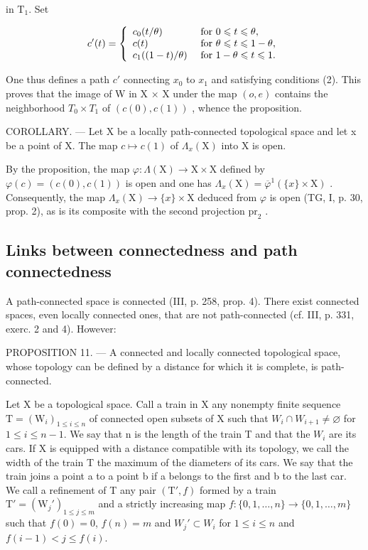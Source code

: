 in \(\mathrm{T}_1\). Set

\[
c ^ {\prime} (t) = \left\{ \begin{array}{l l} c _ {0} (t / \theta) & \text { for } 0 \leqslant t \leqslant \theta , \\ c (t) & \text { for } \theta \leqslant t \leqslant 1 - \theta , \\ c _ {1} ((1 - t) / \theta) & \text { for } 1 - \theta \leqslant t \leqslant 1. \end{array} \right.
\]

One thus defines a path \(c'\) connecting \(x_{0}\) to \(x_{1}\) and satisfying conditions (2). This proves that the image of W in X × X under the map \((o, e)\) contains the neighborhood \(T_{0} \times T_{1}\) of \((c(0), c(1))\) , whence the proposition.

COROLLARY. --- Let X be a locally path-connected topological space and let x be a point of X. The map \(c \mapsto c(1)\) of \(\Lambda_{x}(\mathrm{X})\) into X is open.

By the proposition, the map \(\varphi\colon\Lambda(\mathrm{X})\to\mathrm{X}\times\mathrm{X}\) defined by \(\varphi(c)=(c(0),c(1))\) is open and one has \(\Lambda_{x}(\mathrm{X})=\overline{\varphi}^{1}(\{x\}\times\mathrm{X})\) . Consequently, the map \(\Lambda_{x}(\mathrm{X})\to\{x\}\times\mathrm{X}\) deduced from \(\varphi\) is open (TG, I, p. 30, prop. 2), as is its composite with the second projection \(\mathrm{pr}_{2}\) .

\subsection{Links between connectedness and path connectedness}

A path-connected space is connected (III, p. 258, prop. 4). There exist connected spaces, even locally connected ones, that are not path-connected (cf. III, p. 331, exerc. 2 and 4). However:

PROPOSITION 11. --- A connected and locally connected topological space, whose topology can be defined by a distance for which it is complete, is path-connected.

Let X be a topological space. Call a train in X any nonempty finite sequence \(\mathrm{T} = (\mathrm{W}_{i})_{1 \leqslant i \leqslant n}\) of connected open subsets of X such that \(W_{i} \cap W_{i+1} \neq \varnothing\) for \(1 \leqslant i \leqslant n-1\). We say that n is the length of the train T and that the \(W_{i}\) are its cars. If X is equipped with a distance compatible with its topology, we call the width of the train T the maximum of the diameters of its cars. We say that the train joins a point a to a point b if a belongs to the first and b to the last car. We call a refinement of T any pair \((\mathrm{T}', f)\) formed by a train \(\mathrm{T}' = (\mathrm{W}_{j}')_{1 \leqslant j \leqslant m}\) and a strictly increasing map \(f: \{0, 1, \ldots, n\} \to \{0, 1, \ldots, m\}\) such that \(f(0) = 0\), \(f(n) = m\) and \(W_{j}' \subset W_{i}\) for \(1 \leqslant i \leqslant n\) and \(f(i-1) < j \leqslant f(i)\).

